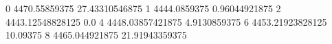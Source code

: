 0 4470.55859375 27.43310546875
1 4444.0859375 0.96044921875
2 4443.12548828125 0.0
4 4448.03857421875 4.9130859375
6 4453.21923828125 10.09375
8 4465.044921875 21.91943359375
